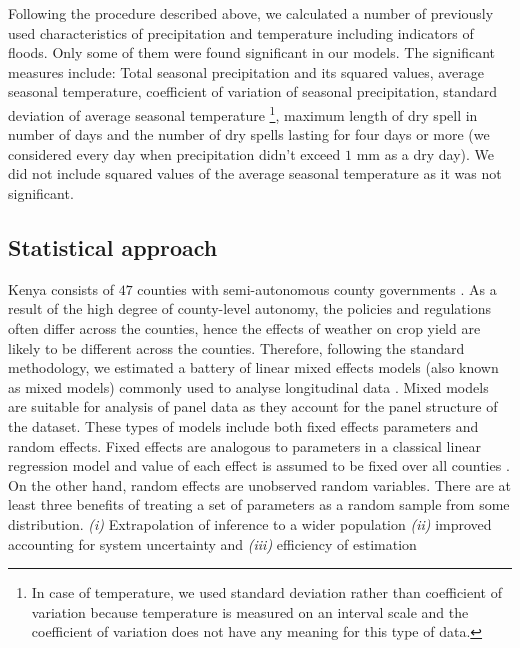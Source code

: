 \documentclass[12pt]{iopart}
\begin{document}
Following the procedure described above, we calculated a number of previously used characteristics of precipitation and temperature including indicators of floods. Only some of them were found significant in our models. The significant measures include: Total seasonal precipitation and its squared values, average seasonal temperature, coefficient of variation of seasonal precipitation, standard deviation of average seasonal temperature \footnote{In case of temperature, we used standard deviation rather than coefficient of variation because temperature is measured on an interval scale and the coefficient of variation does not have any meaning for this type of data. },  maximum length of dry spell in number of days and the number of dry spells lasting for four days or more (we considered every day when precipitation didn't exceed $1$ mm as a dry day). We did not include squared values of the average seasonal temperature as it was not significant.
\subsection{Statistical approach}\label{stats}


\sloppy
Kenya consists of $47$ counties with semi-autonomous county governments  \cite{Barasa2017}. As a result of the high degree of county-level autonomy, the policies and regulations often differ across the counties, hence the effects of weather on crop yield are likely to be different across the counties. Therefore, following the standard methodology, we estimated a battery of linear mixed effects models (also known as mixed models) commonly used to analyse longitudinal data \cite{bates2000mixed}. Mixed models are suitable for analysis of panel data as they account for the panel structure of the dataset. These types of models include both fixed effects parameters and random effects. Fixed effects are analogous to parameters in a classical linear regression model and value of each effect is assumed to be fixed over all counties \cite{bates2010lme4}. On the other hand, random effects are unobserved random variables. There are at least three benefits of treating a set of parameters as a random sample from some distribution. \textit{(i)} Extrapolation of inference to a wider population \textit{(ii)} improved accounting for system uncertainty and \textit{(iii)} efficiency of estimation %
\end{document}
